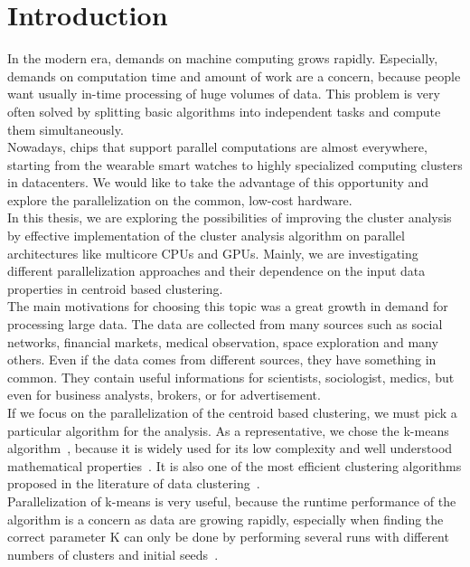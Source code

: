 \pagestyle{plain}
\setcounter{page}{1}

\chapter{Introduction}
In the modern era, demands on machine computing grows rapidly. Especially, demands on computation time and amount of work are a concern, because people want usually in-time processing of huge volumes of data. This problem is very often solved by splitting basic algorithms into independent tasks and compute them simultaneously.\\
Nowadays, chips that support parallel computations are almost everywhere, starting from the wearable smart watches to highly specialized computing clusters in datacenters. We would like to take the advantage of this opportunity and explore the parallelization on the common, low-cost hardware.\\

In this thesis, we are exploring the possibilities of improving the cluster analysis by effective implementation of the cluster analysis algorithm on parallel architectures like multicore CPUs and GPUs. Mainly, we are investigating different parallelization approaches and their dependence on the input data properties in centroid based clustering.\\
The main motivations for choosing this topic was a great growth in demand for processing large data. The data are collected from many sources such as social networks, financial markets, medical observation, space exploration and many others. Even if the data comes from different sources, they have something in common. They contain useful informations for scientists, sociologist, medics, but even for business analysts, brokers, or for advertisement. \\

If we focus on the parallelization of the centroid based clustering, we must pick a particular algorithm for the analysis. As a representative, we chose the k-means algorithm~\cite{EstivillCastro02}, because it is widely used for its low complexity and well understood mathematical properties~\cite{Zechner09}. It is also one of the most efficient clustering algorithms proposed in the literature of data clustering~\cite{Aggarwal13}.\\
Parallelization of k-means is very useful, because the runtime performance of the algorithm is a concern as data are growing rapidly, especially when finding the correct parameter K can only be done by performing several runs with different numbers of clusters and initial seeds~\cite{Zechner09}.\\

